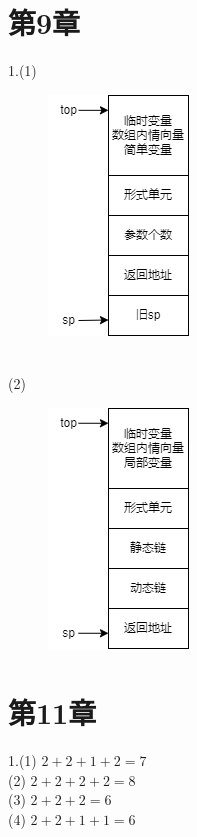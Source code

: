 \documentclass{article}
\begin{document}
\section{第9章}
1.(1)
\begin{figure}[htbp]
    \centering
    \includegraphics[scale=0.8]{C.png}
    \caption{}
\end{figure}
\\
(2)
\begin{figure}[htbp]
    \centering
    \includegraphics[scale=0.8]{Pascal.png}
    \caption{}
\end{figure}


\section{第11章}
1.(1) $2 + 2 + 1 + 2 = 7$ \\
(2) $2 + 2 + 2 + 2 = 8$ \\
(3) $2 + 2 + 2 = 6$ \\
(4) $2 + 2 + 1 + 1 = 6$
\end{document}
